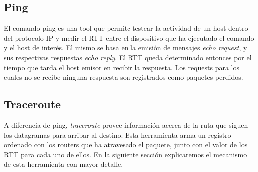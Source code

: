 \subsection{Ping}

El comando ping es una tool que permite testear la actividad de un host dentro del protocolo IP y medir
el RTT entre el dispositivo que ha ejecutado el comando y el host de inter\'es. El mismo se basa en
la emisi\'on de mensajes \emph{echo request}, y sus respectivas respuestas \emph{echo reply}. El RTT queda
determinado entonces por el tiempo que tarda el host emisor en recibir la respuesta.
Los requests para los cuales no se recibe ninguna respuesta son registrados como paquetes perdidos.

\subsection{Traceroute}

A diferencia de ping, \emph{traceroute} provee informaci\'on acerca de la ruta que siguen los datagramas
para arribar al destino. Esta herramienta arma un registro ordenado con los routers que ha atravesado
el paquete, junto con el valor de los RTT para cada uno de ellos.
En la siguiente secci\'on explicaremos el
mecanismo de esta herramienta con mayor detalle.
